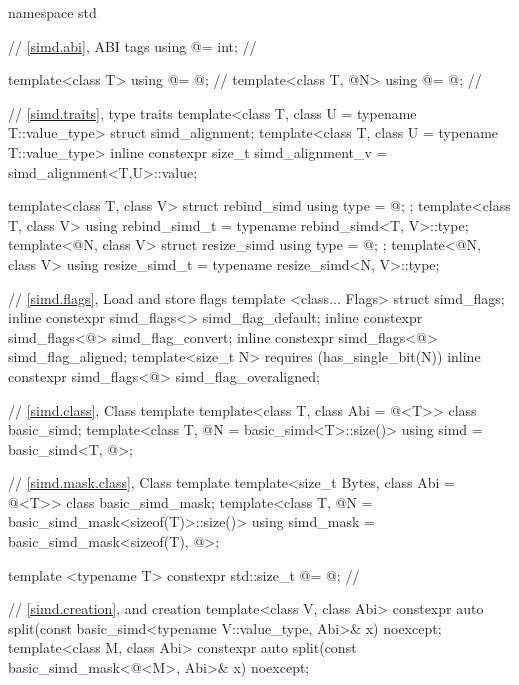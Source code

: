 \begin{codeblock}
namespace std {
  // \ref{simd.abi},  ABI tags
  using @\simdsizetype@ = int; // \expos

  template<class T> using @\nativeabi@ = @\seebelow@; // \expos
  template<class T, @\simdsizetype@ N> using @\deducet@ = @\seebelow@; // \expos

  // \ref{simd.traits},  type traits
  template<class T, class U = typename T::value_type> struct simd_alignment;
  template<class T, class U = typename T::value_type>
    inline constexpr size_t simd_alignment_v = simd_alignment<T,U>::value;

  template<class T, class V> struct rebind_simd { using type = @\seebelow@; };
  template<class T, class V> using rebind_simd_t = typename rebind_simd<T, V>::type;
  template<@\simdsizetype@ N, class V> struct resize_simd { using type = @\seebelow@; };
  template<@\simdsizetype@ N, class V> using resize_simd_t = typename resize_simd<N, V>::type;

  // \ref{simd.flags}, Load and store flags
  template <class... Flags> struct simd_flags;
  inline constexpr simd_flags<> simd_flag_default{};
  inline constexpr simd_flags<@\seebelow@> simd_flag_convert{};
  inline constexpr simd_flags<@\seebelow@> simd_flag_aligned{};
  template<size_t N> requires (has_single_bit(N))
    inline constexpr simd_flags<@\seebelow@> simd_flag_overaligned{};

  // \ref{simd.class}, Class template 
  template<class T, class Abi = @\nativeabi@<T>> class basic_simd;
  template<class T, @\simdsizetype@ N = basic_simd<T>::size()>
    using simd = basic_simd<T, @>;

  // \ref{simd.mask.class}, Class template 
  template<size_t Bytes, class Abi = @\nativeabi@<T>> class basic_simd_mask;
  template<class T, @\simdsizetype@ N = basic_simd_mask<sizeof(T)>::size()>
    using simd_mask = basic_simd_mask<sizeof(T), @>;

  template <typename T>
    constexpr std::size_t @\maskelementsize@ = @\seebelow@; // \expos

  // \ref{simd.creation},  and  creation
  template<class V, class Abi>
    constexpr auto
      split(const basic_simd<typename V::value_type, Abi>& x) noexcept;
  template<class M, class Abi>
    constexpr auto
      split(const basic_simd_mask<@\maskelementsize@<M>, Abi>& x) noexcept;

}
\end{codeblock}
